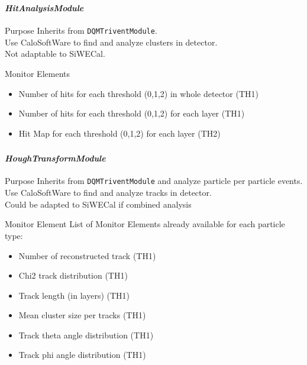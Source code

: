 \documentclass[8pt]{beamer}
\begin{document}
  \begin{frame}[containsverbatim]
  \frametitle{\secname}
  \framesubtitle{\textit{HitAnalysisModule}}


    \begin{block}{Purpose}
      Inherits from \verb|DQMTriventModule|. \\
      Use CaloSoftWare to find and analyze clusters in detector. \\
      Not adaptable to SiWECal.
    \end{block}

    \begin{block}{Monitor Elements}
      \begin{itemize}
        \item Number of hits for each threshold (0,1,2) in whole detector (TH1)
        \item Number of hits for each threshold (0,1,2) for each layer (TH1)
        \item Hit Map for each threshold (0,1,2) for each layer (TH2)
      \end{itemize}
      \end{block}

  \end{frame}


  \begin{frame}[containsverbatim]
  \frametitle{\secname}
  \framesubtitle{\textit{HoughTransformModule}}

    \begin{block}{Purpose}
      Inherits from \verb|DQMTriventModule| and analyze particle per particle events. \\
      Use CaloSoftWare to find and analyze tracks in detector. \\
      Could be adapted to SiWECal if combined analysis
    \end{block}

  \begin{block}{Monitor Element}
    List of Monitor Elements already available for each particle type:
      \begin{itemize}
        \item Number of reconstructed track (TH1)
        \item Chi2 track distribution (TH1)
        \item Track length (in layers) (TH1)
        \item Mean cluster size per tracks (TH1)
        \item Track theta angle distribution (TH1)
        \item Track phi angle distribution (TH1)
      \end{itemize}
  \end{block}{}

  \end{frame}
\end{document}
